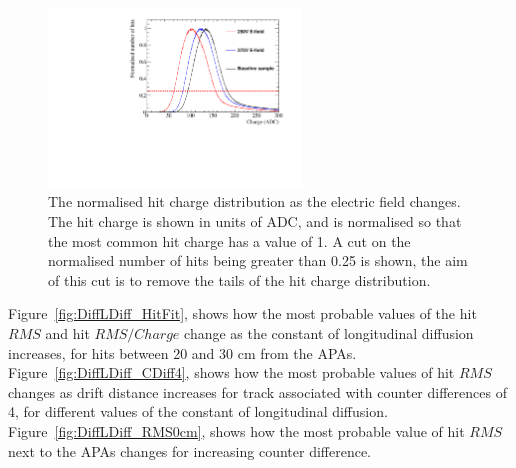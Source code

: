 \begin{figure}
  \centering
  \includegraphics[width=0.6\textwidth]{Canvas_ChargeCut_ElecField}
  \caption[The normalised hit charge distribution as the electric field changes]
          {The normalised hit charge distribution as the electric field changes. The hit charge is shown in units of ADC, and is normalised so that the most common hit charge has a value of 1. A cut on the normalised number of hits being greater than 0.25 is shown, the aim of this cut is to remove the tails of the hit charge distribution.}
  \label{fig:DiffElecStudy_ChargeCut}
\end{figure}

Figure~\ref{fig:DiffLDiff_HitFit}, shows how the most probable values of the hit $RMS$ and hit $RMS/Charge$ change as the constant of longitudinal diffusion increases, for hits between 20 and 30 cm from the APAs. Figure~\ref{fig:DiffLDiff_CDiff4}, shows how the most probable values of hit $RMS$ changes as drift distance increases for track associated with counter differences of 4, for different values of the constant of longitudinal diffusion. Figure~\ref{fig:DiffLDiff_RMS0cm}, shows how the most probable value of hit $RMS$ next to the APAs changes for increasing counter difference. \\ 

